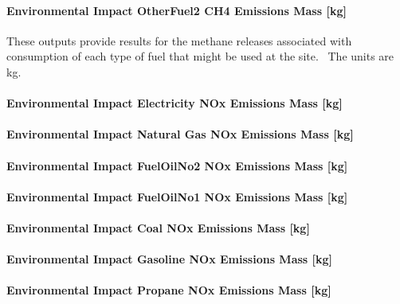 \paragraph{Environmental Impact OtherFuel2 CH4 Emissions Mass {[}kg{]}}\label{environmental-impact-otherfuel2-ch4-emissions-mass-kg}

These outputs provide results for the methane releases associated with consumption of each type of fuel that might be used at the site.~ The units are kg.

\paragraph{Environmental Impact Electricity NOx Emissions Mass {[}kg{]}}\label{environmental-impact-electricity-nox-emissions-mass-kg}

\paragraph{Environmental Impact Natural Gas NOx Emissions Mass {[}kg{]}}\label{environmental-impact-natural-gas-nox-emissions-mass-kg}

\paragraph{Environmental Impact FuelOilNo2 NOx Emissions Mass {[}kg{]}}\label{environmental-impact-fuel-oil-2-nox-emissions-mass-kg}

\paragraph{Environmental Impact FuelOilNo1 NOx Emissions Mass {[}kg{]}}\label{environmental-impact-fuel-oil-1-nox-emissions-mass-kg}

\paragraph{Environmental Impact Coal NOx Emissions Mass {[}kg{]}}\label{environmental-impact-coal-nox-emissions-mass-kg}

\paragraph{Environmental Impact Gasoline NOx Emissions Mass {[}kg{]}}\label{environmental-impact-gasoline-nox-emissions-mass-kg}

\paragraph{Environmental Impact Propane NOx Emissions Mass {[}kg{]}}\label{environmental-impact-propane-nox-emissions-mass-kg}

